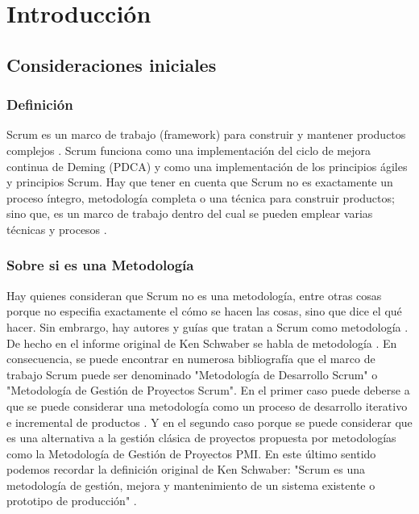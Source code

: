 \chapter{Introducción}

\section{Consideraciones iniciales}

\subsection{Definición}

Scrum es un marco de trabajo (framework) para construir y mantener productos complejos \cite{SBOK-2013} \cite{Scrum-Alliance-2015}. 
Scrum funciona como una implementación del ciclo de mejora continua de Deming (PDCA) y como una implementación de los principios ágiles y principios Scrum. Hay que tener en cuenta que Scrum no es exactamente un proceso íntegro, metodología completa o una técnica para construir productos; sino que, es un marco de trabajo dentro del cual se pueden emplear varias técnicas y procesos \cite{Agile-Atlas-2012}. 

\subsection{Sobre si es una Metodología}

Hay quienes consideran que Scrum no es una metodología, entre otras cosas porque no especifia exactamente el cómo se hacen las cosas, 
sino que dice el qué hacer. Sin embrargo, hay autores y guías que tratan a Scrum como metodología \cite{SBOK-2013}. De hecho en el informe original de Ken Schwaber se habla de metodología \cite{Ken-Schwaber-1995}. En consecuencia, se puede encontrar en numerosa bibliografía que el marco de trabajo Scrum puede ser denominado "Metodología de Desarrollo Scrum" o "Metodología de Gestión de Proyectos Scrum". 
En el primer caso puede deberse a que se puede considerar una metodología como un proceso de desarrollo iterativo e incremental de productos \cite{Ken-Schwaber-1995}. Y en el segundo caso porque se puede considerar que es una alternativa a la gestión clásica de proyectos propuesta por metodologías como la Metodología de Gestión de Proyectos PMI. En este último sentido podemos recordar la definición original de Ken Schwaber: "Scrum es una metodología de gestión, mejora y mantenimiento de un sistema existente o prototipo de producción" \cite{Ken-Schwaber-1995}.
 
